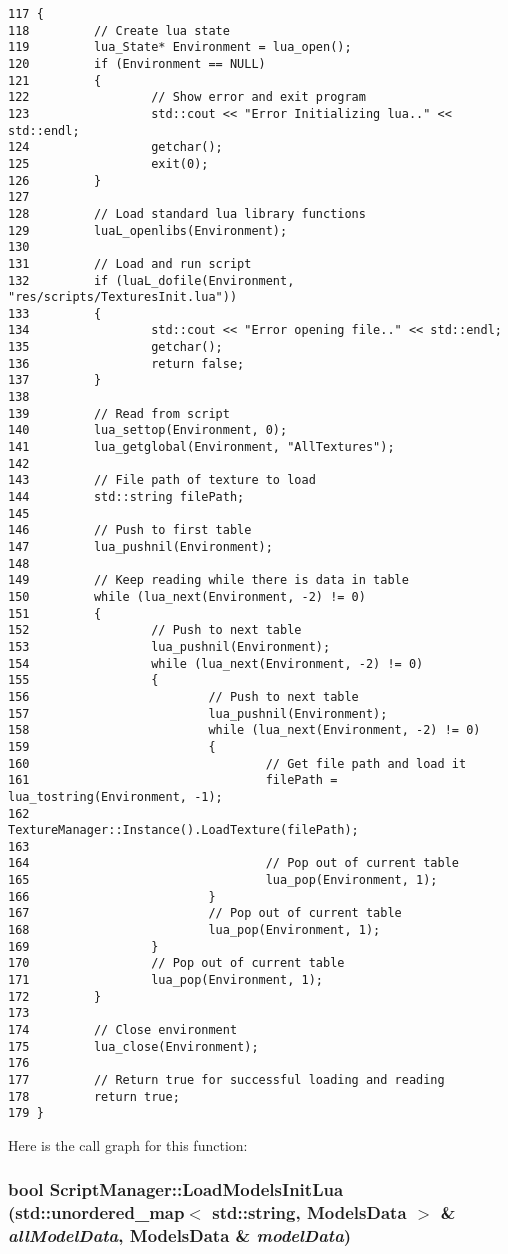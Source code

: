 \begin{Code}\begin{verbatim}117 {
118         // Create lua state
119         lua_State* Environment = lua_open();
120         if (Environment == NULL)
121         {
122                 // Show error and exit program
123                 std::cout << "Error Initializing lua.." << std::endl;
124                 getchar();
125                 exit(0);
126         }
127 
128         // Load standard lua library functions
129         luaL_openlibs(Environment);
130 
131         // Load and run script
132         if (luaL_dofile(Environment, "res/scripts/TexturesInit.lua"))
133         {
134                 std::cout << "Error opening file.." << std::endl;
135                 getchar();
136                 return false;
137         }
138 
139         // Read from script
140         lua_settop(Environment, 0);
141         lua_getglobal(Environment, "AllTextures");
142 
143         // File path of texture to load
144         std::string filePath;
145 
146         // Push to first table
147         lua_pushnil(Environment);
148 
149         // Keep reading while there is data in table
150         while (lua_next(Environment, -2) != 0)
151         {
152                 // Push to next table
153                 lua_pushnil(Environment);
154                 while (lua_next(Environment, -2) != 0)
155                 {
156                         // Push to next table
157                         lua_pushnil(Environment);
158                         while (lua_next(Environment, -2) != 0)
159                         {
160                                 // Get file path and load it
161                                 filePath = lua_tostring(Environment, -1);
162                                 TextureManager::Instance().LoadTexture(filePath);
163 
164                                 // Pop out of current table
165                                 lua_pop(Environment, 1);
166                         }
167                         // Pop out of current table
168                         lua_pop(Environment, 1);
169                 }
170                 // Pop out of current table
171                 lua_pop(Environment, 1);
172         }
173 
174         // Close environment
175         lua_close(Environment);
176 
177         // Return true for successful loading and reading
178         return true;
179 }
\end{verbatim}
\end{Code}




Here is the call graph for this function:\hypertarget{class_script_manager_6d85eb0c7b7cdb99e4e6d98300cf47c8}{
\subsubsection[LoadModelsInitLua]{\setlength{\rightskip}{0pt plus 5cm}bool ScriptManager::LoadModelsInitLua (std::unordered\_\-map$<$ std::string, {\bf ModelsData} $>$ \& {\em allModelData}, \/  {\bf ModelsData} \& {\em modelData})}}
\label{class_script_manager_6d85eb0c7b7cdb99e4e6d98300cf47c8}


